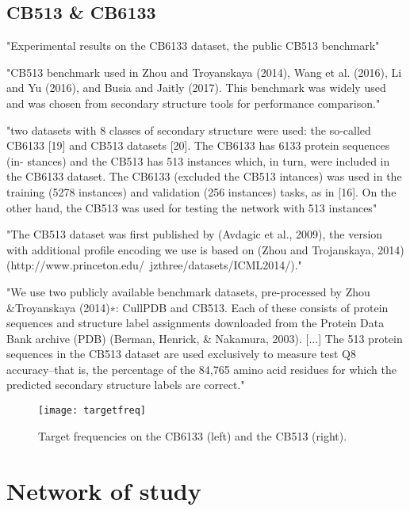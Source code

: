 \subsection{CB513 \& CB6133}
"Experimental results on the CB6133 dataset, the public CB513 benchmark" \cite{Li2016}

"CB513 benchmark used in Zhou and Troyanskaya (2014), Wang et al. (2016), Li and Yu (2016), and Busia and Jaitly (2017). This benchmark was widely used and was chosen from secondary structure tools for performance comparison." \cite{Fang2017}

"two datasets with 8 classes of secondary structure were used: the so-called CB6133 [19] and CB513 datasets [20]. The CB6133 has 6133 protein sequences (in- stances) and the CB513 has 513 instances which, in turn, were included in the CB6133 dataset. The CB6133 (excluded the CB513 intances) was used in the training (5278 instances) and validation (256 instances) tasks, as in [16]. On the other hand, the CB513 was used for testing the network with 513 instances" \cite{Hattori2017}

"The CB513 dataset was first published by (Avdagic et al., 2009), the version with additional profile encoding we use is based on (Zhou and  Trojanskaya, 2014) (http://www.princeton.edu/~jzthree/datasets/ICML2014/)." \cite{Jurtz2017}

"We use two publicly available benchmark datasets, pre-processed by Zhou \&Troyanskaya (2014)∗: CullPDB and CB513. Each of these consists of protein sequences and structure label assignments downloaded from the Protein Data Bank archive (PDB) (Berman, Henrick, \& Nakamura, 2003). [...] The 513 protein sequences in the CB513 dataset are used exclusively to measure test Q8 accuracy–that is, the percentage of the 84,765 amino acid residues for which the predicted secondary structure labels are correct." \cite{Busia2017}

\begin{figure}[h]
	\centering
	\texttt{[image: targetfreq]}
	\caption{Target frequencies on the CB6133 (left) and the CB513 (right).}
	\label{fig:targetfreq}
\end{figure}


\section{Network of study}\label{sect:network}

